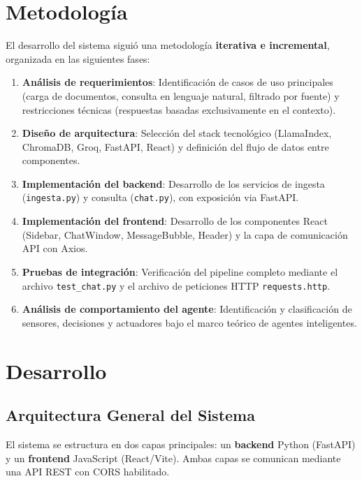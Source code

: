 \documentclass[12pt,a4paper]{article}
\begin{document}
\section{Metodología}

El desarrollo del sistema siguió una metodología \textbf{iterativa e incremental}, organizada en las siguientes fases:

\begin{enumerate}[leftmargin=1.5cm]
  \item \textbf{Análisis de requerimientos}: Identificación de casos de uso principales (carga de documentos, consulta en lenguaje natural, filtrado por fuente) y restricciones técnicas (respuestas basadas exclusivamente en el contexto).
  \item \textbf{Diseño de arquitectura}: Selección del stack tecnológico (LlamaIndex, ChromaDB, Groq, FastAPI, React) y definición del flujo de datos entre componentes.
  \item \textbf{Implementación del backend}: Desarrollo de los servicios de ingesta (\texttt{ingesta.py}) y consulta (\texttt{chat.py}), con exposición via FastAPI.
  \item \textbf{Implementación del frontend}: Desarrollo de los componentes React (Sidebar, ChatWindow, MessageBubble, Header) y la capa de comunicación API con Axios.
  \item \textbf{Pruebas de integración}: Verificación del pipeline completo mediante el archivo \texttt{test\_chat.py} y el archivo de peticiones HTTP \texttt{requests.http}.
  \item \textbf{Análisis de comportamiento del agente}: Identificación y clasificación de sensores, decisiones y actuadores bajo el marco teórico de agentes inteligentes.
\end{enumerate}

\section{Desarrollo}

\subsection{Arquitectura General del Sistema}

El sistema se estructura en dos capas principales: un \textbf{backend} Python (FastAPI) y un \textbf{frontend} JavaScript (React/Vite). Ambas capas se comunican mediante una API REST con CORS habilitado.
\end{document}
